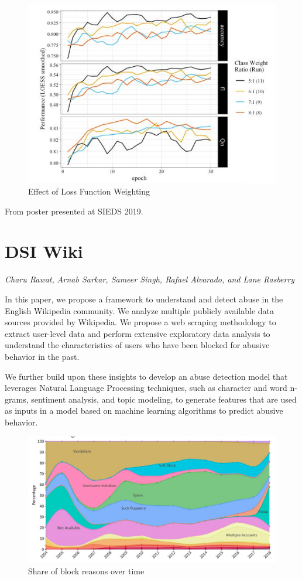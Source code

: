 \begin{figure}[!hbtp]
\includegraphics[width=\textwidth]{images/bmc2}
\caption{Effect of Loss Function Weighting}
\end{figure}



From poster presented at SIEDS 2019.

\section{DSI Wiki}
\label{sec:wik}

\emph{Charu Rawat, Arnab Sarkar, Sameer Singh, Rafael Alvarado, and Lane Rasberry}
\bigskip

In this paper, we propose a framework to understand and detect abuse in the English Wikipedia community. We analyze multiple publicly available data sources provided by Wikipedia. We propose a web scraping methodology to extract user-level data and perform extensive exploratory data analysis to understand the characteristics of users who have been blocked for abusive behavior in the past.

We further build upon these insights to develop an abuse detection model that leverages Natural Language Processing techniques, such as character and word n-grams, sentiment analysis, and topic modeling, to generate features that are used as inputs in a model based on machine learning algorithms to predict abusive behavior.

\begin{figure}[!hbtp]
\includegraphics[width=\textwidth]{images/wiki1}
\caption{Share of block reasons over time}
\end{figure}


